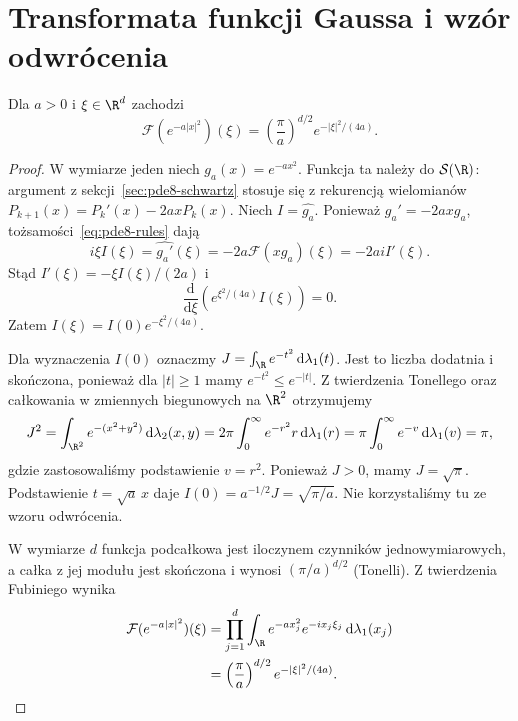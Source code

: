 \section{Transformata funkcji Gaussa i wzór odwrócenia}
\label{sec:pde8-inversion}

\begin{lemat}
\label{lem:pde8-gauss}
Dla $a>0$ i $\xi\in\R^d$ zachodzi
\begin{equation}\label{eq:pde8-gauss}
 \mathcal F(e^{-a|x|^2})(\xi)
 =\left(\frac\pi a\right)^{d/2}e^{-|\xi|^2/(4a)}.
\end{equation}
\end{lemat}
\begin{proof}
W wymiarze jeden niech $g_a(x)=e^{-ax^2}$.
Funkcja ta należy do $\mathcal S(\R)$:
argument z sekcji~\ref{sec:pde8-schwartz} stosuje się
z rekurencją wielomianów
$P_{k+1}(x)=P_k'(x)-2axP_k(x)$.
Niech $I=\widehat{g_a}$. Ponieważ
$g_a'=-2axg_a$, tożsamości~\eqref{eq:pde8-rules}
dają
\[
 i\xi I(\xi)=\widehat{g_a'}(\xi)
 =-2a\mathcal F(xg_a)(\xi)=-2aiI'(\xi).
\]
Stąd $I'(\xi)=-\xi I(\xi)/(2a)$ i
\[
 \frac{\mathrm d}{\mathrm d\xi}
 \left(e^{\xi^2/(4a)}I(\xi)\right)=0.
\]
Zatem $I(\xi)=I(0)e^{-\xi^2/(4a)}$.

Dla wyznaczenia $I(0)$ oznaczmy
$J=\int_\R e^{-t^2}\,\mathrm d\lambda_1(t)$.
Jest to liczba dodatnia i skończona, ponieważ
dla $|t|\ge1$ mamy $e^{-t^2}\le e^{-|t|}$.
Z twierdzenia Tonellego oraz całkowania w
zmiennych biegunowych na $\R^2$ otrzymujemy
\[
 J^2=\int_{\R^2}e^{-(x^2+y^2)}\,\mathrm d\lambda_2(x,y)
 =2\pi\int_0^\infty e^{-r^2}r\,\mathrm d\lambda_1(r)
 =\pi\int_0^\infty e^{-v}\,\mathrm d\lambda_1(v)
 =\pi,
\]
gdzie zastosowaliśmy podstawienie $v=r^2$.
Ponieważ $J>0$, mamy $J=\sqrt\pi$.
Podstawienie $t=\sqrt a\,x$ daje
$I(0)=a^{-1/2}J=\sqrt{\pi/a}$.
Nie korzystaliśmy tu ze wzoru odwrócenia.

W wymiarze $d$ funkcja podcałkowa jest
iloczynem czynników jednowymiarowych, a całka
z jej modułu jest skończona i wynosi
$(\pi/a)^{d/2}$ (Tonelli). Z twierdzenia
Fubiniego wynika
\[
 \begin{aligned}
 \mathcal F(e^{-a|x|^2})(\xi)
 &=\prod_{j=1}^d
 \int_\R e^{-ax_j^2}e^{-ix_j\xi_j}\,
 \mathrm d\lambda_1(x_j)\\
 &=\left(\frac{\pi}{a}\right)^{d/2}
 e^{-|\xi|^2/(4a)}.
 \end{aligned}
\]
\end{proof}

